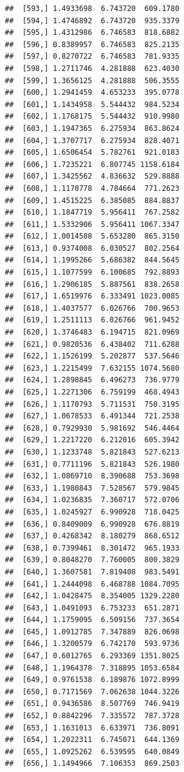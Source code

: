 \documentclass[article]{jss}\usepackage[]{graphicx}\usepackage[]{xcolor}
\makeatletter
\newenvironment{kframe}{%
 \def\at@end@of@kframe{}%
 \ifinner\ifhmode%
  \def\at@end@of@kframe{\end{minipage}}%
  \begin{minipage}{\columnwidth}%
 \fi\fi%
 \def\FrameCommand##1{\hskip\@totalleftmargin \hskip-\fboxsep
 \colorbox{shadecolor}{##1}\hskip-\fboxsep
     \hskip-\linewidth \hskip-\@totalleftmargin \hskip\columnwidth}%
 \MakeFramed {\advance\hsize-\width
   \@totalleftmargin\z@ \linewidth\hsize
   \@setminipage}}%
 {\par\unskip\endMakeFramed%
 \at@end@of@kframe}
\newenvironment{knitrout}{}{} %
\makeatother
\begin{document}
\begin{knitrout}
\begin{kframe}
\begin{verbatim}
##  [593,] 1.4933698  6.743720  609.1780
##  [594,] 1.4746892  6.743720  935.3379
##  [595,] 1.4312986  6.746583  818.6882
##  [596,] 0.8389957  6.746583  825.2135
##  [597,] 0.8270722  6.746583  781.9335
##  [598,] 1.2711746  4.281888  623.4030
##  [599,] 1.3656125  4.281888  506.3555
##  [600,] 1.2941459  4.653233  395.0778
##  [601,] 1.1434958  5.544432  984.5234
##  [602,] 1.1768175  5.544432  910.9980
##  [603,] 1.1947365  6.275934  863.8624
##  [604,] 1.3707717  6.275934  828.4071
##  [605,] 1.6506454  5.782761  921.0183
##  [606,] 1.7235221  6.807745 1158.6184
##  [607,] 1.3425562  4.836632  529.8888
##  [608,] 1.1170778  4.784664  771.2623
##  [609,] 1.4515225  6.385085  884.8837
##  [610,] 1.1847719  5.956411  767.2582
##  [611,] 1.5332906  5.956411 1067.3347
##  [612,] 1.0014588  5.653280  865.3150
##  [613,] 0.9374008  6.030527  802.2564
##  [614,] 1.1995266  5.686382  844.5645
##  [615,] 1.1077599  6.100685  792.8893
##  [616,] 1.2906185  5.887561  838.2658
##  [617,] 1.6519976  6.333491 1023.0085
##  [618,] 1.4037577  6.026766  700.9653
##  [619,] 1.2511113  6.026766  961.9452
##  [620,] 1.3746483  6.194715  821.0969
##  [621,] 0.9820536  6.438402  711.6288
##  [622,] 1.1526199  5.202877  537.5646
##  [623,] 1.2215499  7.632155 1074.5680
##  [624,] 1.2898845  6.496273  736.9779
##  [625,] 1.2271306  6.759199  468.4943
##  [626,] 1.1170793  5.711531  750.3195
##  [627,] 1.0678533  6.491344  721.2538
##  [628,] 0.7929930  5.981692  546.4464
##  [629,] 1.2217220  6.212016  605.3942
##  [630,] 1.1233748  5.821843  527.6213
##  [631,] 0.7711196  5.821843  526.1980
##  [632,] 1.0869710  8.390688  753.3698
##  [633,] 1.1980843  7.528567  579.9845
##  [634,] 1.0236835  7.360717  572.0706
##  [635,] 1.0245927  6.990928  718.0425
##  [636,] 0.8409009  6.990928  676.8819
##  [637,] 0.4268342  8.180279  868.6512
##  [638,] 0.7399461  8.301472  965.1933
##  [639,] 0.8048270  7.760005  800.3829
##  [640,] 1.3607581  7.819408  983.5491
##  [641,] 1.2444098  6.468788 1084.7095
##  [642,] 1.0428475  8.354005 1329.2280
##  [643,] 1.0491093  6.753233  651.2871
##  [644,] 1.1759095  6.509156  737.3654
##  [645,] 1.0912785  7.347889  826.0698
##  [646,] 1.3200579  6.742170  593.9736
##  [647,] 0.6012765  6.293369 1351.8025
##  [648,] 1.1964378  7.318895 1053.6584
##  [649,] 0.9761538  6.189876 1072.8999
##  [650,] 0.7171569  7.062638 1044.3226
##  [651,] 0.9436586  8.507769  746.9419
##  [652,] 0.8842296  7.335572  787.3728
##  [653,] 1.1631013  6.633971  736.8091
##  [654,] 1.2022311  6.745071  644.1369
##  [655,] 1.0925262  6.539595  640.0849
##  [656,] 1.1494966  7.106353  869.2503

\end{verbatim}
\end{kframe}
\end{knitrout}
\end{document}
